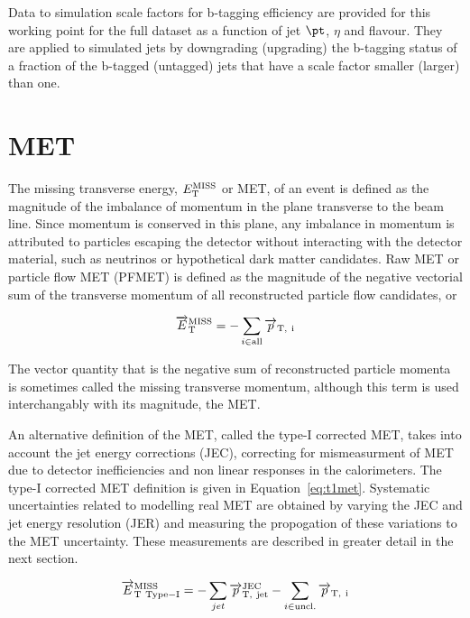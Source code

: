 Data to simulation scale factors for b-tagging efficiency are provided for this working point for the full dataset as a function of jet $\pt$, $\eta$ and flavour.
They are applied to simulated jets by downgrading (upgrading) the b-tagging status of a fraction of the b-tagged (untagged) jets that have a scale factor smaller (larger) than one.

\section{MET}

The missing transverse energy, $E_{\rm{T}}^{\rm{MISS}}$ or MET, of an event is defined as the magnitude of the imbalance of momentum in the plane transverse to the beam line. Since momentum is conserved in this plane, any imbalance in momentum is attributed to particles escaping the detector without interacting with the detector material, such as neutrinos or hypothetical dark matter candidates. Raw MET or particle flow MET (PFMET) is defined as the magnitude of the negative vectorial sum of the transverse momentum of all reconstructed particle flow candidates, or

\begin{equation}
\overrightarrow{E}_{\rm{T}}^{\rm{MISS}} = - \sum_{i \in \rm{all}} \overrightarrow{p}_{\rm{T},\ i}
\end{equation}

The vector quantity that is the negative sum of reconstructed particle momenta is sometimes called the missing transverse momentum, although this term is used interchangably with its magnitude, the MET. 

An alternative definition of the MET, called the type-I corrected MET, takes into account the jet energy corrections (JEC), correcting for mismeasurment of MET due to detector inefficiencies and non linear responses in the calorimeters. The type-I corrected MET definition is given in Equation~\ref{eq:t1met}. Systematic uncertainties related to modelling real MET are obtained by varying the JEC and jet energy resolution (JER) and measuring the propogation of these variations to the MET uncertainty. These measurements are described in greater detail in the next section.

\begin{equation}
\label{eq:t1met}
\overrightarrow{E}_{\rm{T\ Type-I}}^{\rm{MISS}} = - \sum_{jet} \overrightarrow{p}_{\rm{T},\ jet}^{\rm{JEC}} - \sum_{i \in \rm{uncl.}} \overrightarrow{p}_{\rm{T},\ i}
\end{equation}

